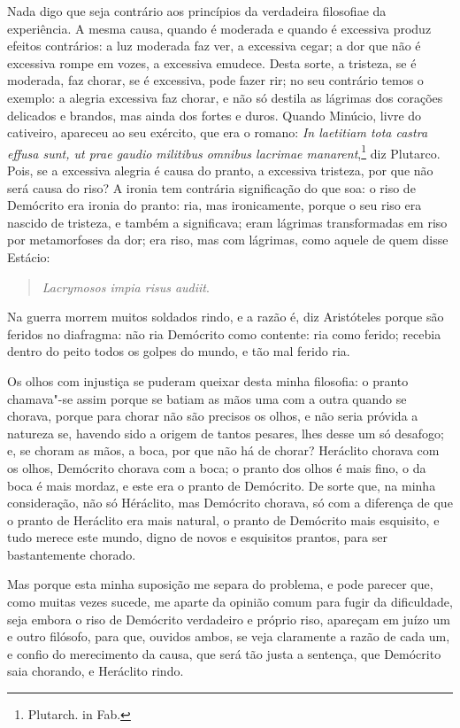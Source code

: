 Nada digo que seja contrário aos princípios da
verdadeira filosofiae da experiência. A mesma causa, quando é moderada e
quando é excessiva produz efeitos contrários: a luz moderada faz ver, a
excessiva cegar; a dor que não é excessiva rompe em vozes, a excessiva
emudece. Desta sorte, a tristeza, se é moderada, faz chorar, se é
excessiva, pode fazer rir; no seu contrário temos o exemplo: a alegria
excessiva faz chorar, e não só destila as lágrimas dos corações
delicados e brandos, mas ainda dos fortes e duros. Quando Minúcio, livre
do cativeiro, apareceu ao seu exército, que era o romano: \emph{In
laetitiam tota castra effusa sunt, ut prae gaudio militibus omnibus lacrimae
manarent},\footnote{Plutarch. in Fab.} diz Plutarco. Pois, se a excessiva alegria é causa do pranto, a excessiva
tristeza, por que não será causa do riso? A ironia tem contrária
significação do que soa: o riso de Demócrito era ironia do pranto: ria,
mas ironicamente, porque o seu riso era nascido de tristeza, e também a
significava; eram lágrimas transformadas em riso por metamorfoses da
dor; era riso, mas com lágrimas, como aquele de quem disse Estácio:

\begin{verse}
\emph{Lacrymosos impia risus audiit}.
\end{verse}

Na guerra morrem muitos soldados rindo, e a razão é, diz Aristóteles
porque são feridos no diafragma: não ria Demócrito como contente: ria
como ferido; recebia dentro do peito todos os golpes do mundo, e tão mal
ferido ria.

Os olhos com injustiça se puderam queixar desta minha filosofia: o
pranto chamava"-se assim porque se batiam as mãos uma com a outra quando
se chorava, porque para chorar não são precisos os olhos, e não seria
próvida a natureza se, havendo sido a origem de tantos pesares, lhes
desse um só desafogo; e, se choram as mãos, a boca, por que não há de
chorar? Heráclito chorava com os olhos, Demócrito chorava com a boca; o
pranto dos olhos é mais fino, o da boca é mais mordaz, e este era o
pranto de Demócrito. De sorte que, na minha consideração, não só
Héráclito, mas Demócrito chorava, só com a diferença de que o pranto de
Heráclito era mais natural, o pranto de Demócrito mais esquisito, e tudo
merece este mundo, digno de novos e esquisitos prantos, para ser
bastantemente chorado.

Mas porque esta minha suposição me separa do problema, e pode parecer
que, como muitas vezes sucede, me aparte da opinião comum para fugir da
dificuldade, seja embora o riso de Demócrito verdadeiro e próprio riso,
apareçam em juízo um e outro filósofo, para que, ouvidos ambos, se veja
claramente a razão de cada um, e confio do merecimento da causa, que
será tão justa a sentença, que Demócrito saia chorando, e Heráclito
rindo.

